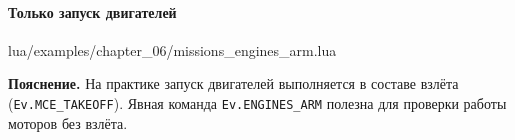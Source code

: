 \paragraph{Только запуск двигателей}
\begin{codefile}{lua/examples/chapter_06/missions_engines_arm.lua}
\end{codefile}
\textbf{Пояснение.} На практике запуск двигателей выполняется в составе взлёта (\texttt{Ev.MCE\_TAKEOFF}). Явная команда \texttt{Ev.ENGINES\_ARM} полезна для проверки работы моторов без взлёта.
